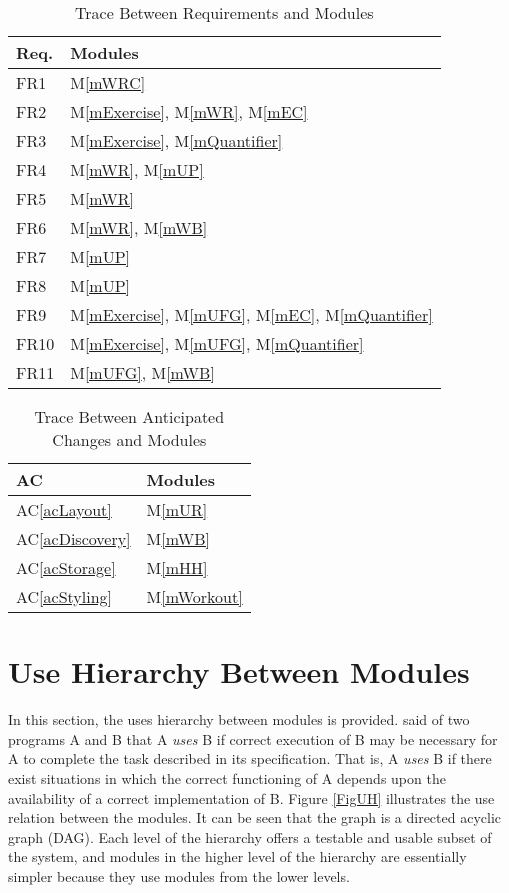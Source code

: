 \documentclass[12pt, titlepage]{article}
\newcommand{\acref}[1]{AC\ref{#1}}
\newcommand{\mref}[1]{M\ref{#1}}
\begin{document}
\begin{table}[H]
\centering
\begin{tabular}{p{} p{}}
\toprule
\textbf{Req.} & \textbf{Modules}\\
\midrule
FR1 & \mref{mWRC}\\
FR2 & \mref{mExercise}, \mref{mWR}, \mref{mEC}\\
FR3 & \mref{mExercise}, \mref{mQuantifier}\\
FR4 & \mref{mWR}, \mref{mUP}\\
FR5 & \mref{mWR}\\
FR6 & \mref{mWR}, \mref{mWB}\\
FR7 & \mref{mUP}\\
FR8 & \mref{mUP}\\
FR9 & \mref{mExercise}, \mref{mUFG}, \mref{mEC}, \mref{mQuantifier}\\
FR10 & \mref{mExercise}, \mref{mUFG}, \mref{mQuantifier}\\
FR11 & \mref{mUFG}, \mref{mWB}\\

\bottomrule
\end{tabular}
\caption{Trace Between Requirements and Modules}
\label{TblRT}
\end{table}

\begin{table}[H]
\centering
\begin{tabular}{p{} p{}}
\toprule
\textbf{AC} & \textbf{Modules}\\
\midrule
\acref{acLayout} & \mref{mUR}\\
\acref{acDiscovery} & \mref{mWB}\\
\acref{acStorage} & \mref{mHH}\\
\acref{acStyling} & \mref{mWorkout}\\
\bottomrule
\end{tabular}
\caption{Trace Between Anticipated Changes and Modules}
\label{TblACT}
\end{table}

\section{Use Hierarchy Between Modules} \label{SecUse}

In this section, the uses hierarchy between modules is
provided. \citet{Parnas1978} said of two programs A and B that A {\em uses} B if
correct execution of B may be necessary for A to complete the task described in
its specification. That is, A {\em uses} B if there exist situations in which
the correct functioning of A depends upon the availability of a correct
implementation of B.  Figure \ref{FigUH} illustrates the use relation between
the modules. It can be seen that the graph is a directed acyclic graph
(DAG). Each level of the hierarchy offers a testable and usable subset of the
system, and modules in the higher level of the hierarchy are essentially simpler
because they use modules from the lower levels.
\end{document}
